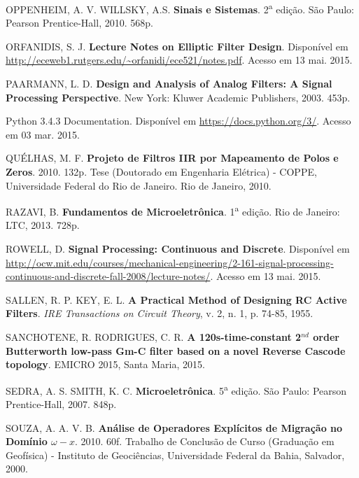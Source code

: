 \begin{thebibliography}{99}
 OPPENHEIM, A. V. WILLSKY, A.S. \textbf{Sinais e Sistemas}. 2\textsuperscript{a} edição. São Paulo: Pearson Prentice-Hall, 2010. 568p.

 ORFANIDIS, S. J. \textbf{Lecture Notes on Elliptic Filter Design}. Disponível em \url{http://eceweb1.rutgers.edu/~orfanidi/ece521/notes.pdf}. Acesso em 13 mai. 2015.

 PAARMANN, L. D. \textbf{Design and Analysis of Analog Filters: A Signal Processing Perspective}. New York: Kluwer Academic Publishers, 2003. 453p.

 Python 3.4.3 Documentation. Disponível em \url{https://docs.python.org/3/}. Acesso em 03 mar. 2015.

 QUÉLHAS, M. F. \textbf{Projeto de Filtros IIR por Mapeamento de Polos e Zeros}. 2010. 132p. Tese (Doutorado em Engenharia Elétrica) - COPPE, Universidade Federal do Rio de Janeiro. Rio de Janeiro, 2010. %

 RAZAVI, B. \textbf{Fundamentos de Microeletrônica}. 1\textsuperscript{a} edição. Rio de Janeiro: LTC, 2013. 728p.

 ROWELL, D. \textbf{Signal Processing: Continuous and Discrete}. Disponível em \url{http://ocw.mit.edu/courses/mechanical-engineering/2-161-signal-processing-continuous-and-discrete-fall-2008/lecture-notes/}. Acesso em 13 mai. 2015.

 SALLEN, R. P. KEY, E. L. \textbf{A  Practical Method of Designing RC Active Filters}. \textit{IRE Transactions on  Circuit Theory}, v. 2, n. 1, p. 74-85, 1955.

 SANCHOTENE, R. RODRIGUES, C. R. \textbf{A 120s-time-constant 2$^{nd}$ order Butterworth low-pass Gm-C filter based on a novel Reverse Cascode topology}. EMICRO 2015, Santa Maria, 2015. %

 SEDRA, A. S. SMITH, K. C. \textbf{Microeletrônica}. 5\textsuperscript{a} edição. São Paulo: Pearson Prentice-Hall, 2007. 848p.

 SOUZA, A. A. V. B. \textbf{Análise de Operadores Explícitos de Migração no Domínio $\omega - x$}. 2010. 60f. Trabalho de Conclusão de Curso (Graduação em Geofísica) - Instituto de Geociências, Universidade Federal da Bahia, Salvador, 2000. %


\end{thebibliography}
